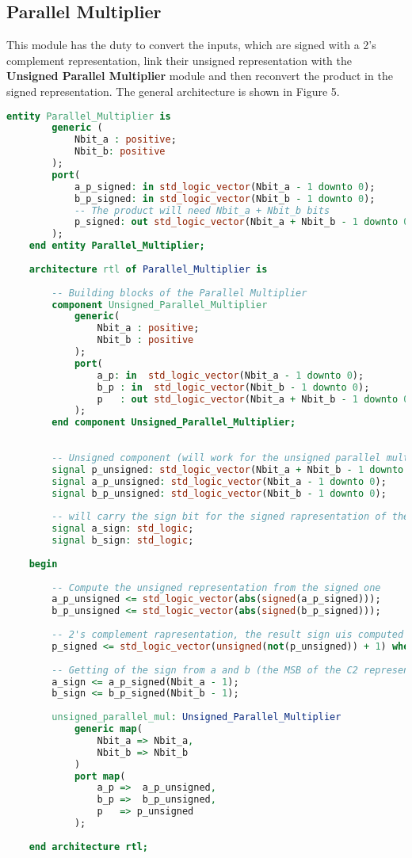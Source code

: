 \subsection{Parallel Multiplier}
This module has the duty to convert the inputs, which are signed with a 2's complement representation, link their unsigned representation with the \textbf{Unsigned Parallel Multiplier} module and then reconvert the product in the signed representation. The general architecture is shown in Figure 5.
\begin{lstlisting}[language=VHDL]
	entity Parallel_Multiplier is
		generic (
			Nbit_a : positive; 
			Nbit_b: positive
		);
		port(
			a_p_signed: in std_logic_vector(Nbit_a - 1 downto 0);
			b_p_signed: in std_logic_vector(Nbit_b - 1 downto 0);
			-- The product will need Nbit_a + Nbit_b bits
			p_signed: out std_logic_vector(Nbit_a + Nbit_b - 1 downto 0)
		);
	end entity Parallel_Multiplier;
	
	architecture rtl of Parallel_Multiplier is
	
		-- Building blocks of the Parallel Multiplier
		component Unsigned_Parallel_Multiplier
			generic(
				Nbit_a : positive;
				Nbit_b : positive
			);
			port(
				a_p: in  std_logic_vector(Nbit_a - 1 downto 0);
				b_p : in  std_logic_vector(Nbit_b - 1 downto 0);
				p   : out std_logic_vector(Nbit_a + Nbit_b - 1 downto 0)
			);
		end component Unsigned_Parallel_Multiplier;
		
		
		-- Unsigned component (will work for the unsigned parallel multiplier
		signal p_unsigned: std_logic_vector(Nbit_a + Nbit_b - 1 downto 0);
		signal a_p_unsigned: std_logic_vector(Nbit_a - 1 downto 0);
		signal b_p_unsigned: std_logic_vector(Nbit_b - 1 downto 0);
		
		-- will carry the sign bit for the signed rapresentation of the inputs
		signal a_sign: std_logic;
		signal b_sign: std_logic;
		
	begin
	
		-- Compute the unsigned representation from the signed one
		a_p_unsigned <= std_logic_vector(abs(signed(a_p_signed)));
		b_p_unsigned <= std_logic_vector(abs(signed(b_p_signed)));
		
		-- 2's complement rapresentation, the result sign uis computed through the xor op. between a and b
		p_signed <= std_logic_vector(unsigned(not(p_unsigned)) + 1) when (((a_sign xor b_sign) = '1')) else p_unsigned;
		
		-- Getting of the sign from a and b (the MSB of the C2 representation)
		a_sign <= a_p_signed(Nbit_a - 1);
		b_sign <= b_p_signed(Nbit_b - 1);
		
		unsigned_parallel_mul: Unsigned_Parallel_Multiplier
			generic map(
				Nbit_a => Nbit_a,
				Nbit_b => Nbit_b
			)
			port map(
				a_p =>  a_p_unsigned,
				b_p =>  b_p_unsigned,
				p   => p_unsigned
			);
		
	end architecture rtl; 
\end{lstlisting}

